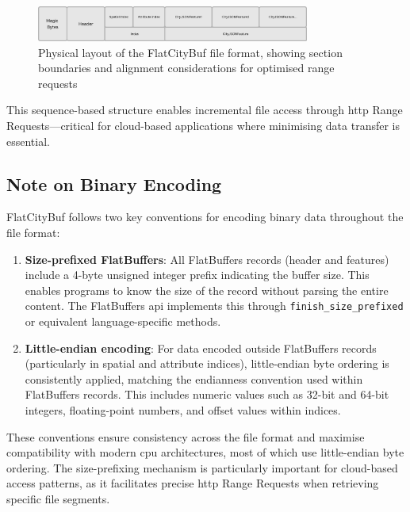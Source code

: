 \begin{figure}[h]
  \centering
  \includegraphics[width=0.8\textwidth]{figs/methodology/file_structure.png}
  \caption{Physical layout of the FlatCityBuf file format, showing section boundaries and alignment considerations for optimised range requests}
  \label{fig:methodology:file-structure}
\end{figure}

This sequence-based structure enables incremental file access through \ac{http} Range Requests—critical for cloud-based applications where minimising data transfer is essential.

\subsection{Note on Binary Encoding}
\label{methodology:overview:note_on_binary_encoding}
FlatCityBuf follows two key conventions for encoding binary data throughout the file format:

\begin{enumerate}
  \item \textbf{Size-prefixed FlatBuffers}: All FlatBuffers records (header and features) include a 4-byte unsigned integer prefix indicating the buffer size. This enables programs to know the size of the record without parsing the entire content. The FlatBuffers \ac{api} implements this through \texttt{finish\_size\_prefixed} or equivalent language-specific methods.
  \item \textbf{Little-endian encoding}: For data encoded outside FlatBuffers records (particularly in spatial and attribute indices), little-endian byte ordering is consistently applied, matching the endianness convention used within FlatBuffers records. This includes numeric values such as 32-bit and 64-bit integers, floating-point numbers, and offset values within indices.
\end{enumerate}

These conventions ensure consistency across the file format and maximise compatibility with modern \ac{cpu} architectures, most of which use little-endian byte ordering. The size-prefixing mechanism is particularly important for cloud-based access patterns, as it facilitates precise \ac{http} Range Requests when retrieving specific file segments.
